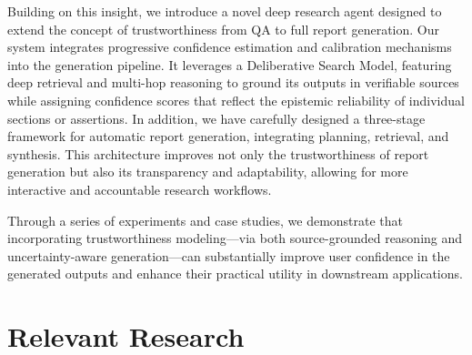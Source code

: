 \documentclass[11pt]{article}
\begin{document}

Building on this insight, we introduce a novel deep research agent designed to extend the concept of trustworthiness from QA to full report generation. Our system integrates progressive confidence estimation and calibration mechanisms into the generation pipeline. It leverages a Deliberative Search Model, featuring deep retrieval and multi-hop reasoning to ground its outputs in verifiable sources while assigning confidence scores that reflect the epistemic reliability of individual sections or assertions. In addition, we have carefully designed a three-stage framework for automatic report generation, integrating planning, retrieval, and synthesis. This architecture improves not only the trustworthiness of report generation but also its transparency and adaptability, allowing for more interactive and accountable research workflows.

Through a series of experiments and case studies, we demonstrate that incorporating trustworthiness modeling—via both source-grounded reasoning and uncertainty-aware generation—can substantially improve user confidence in the generated outputs and enhance their practical utility in downstream applications.


\section{Relevant Research}
\end{document}

